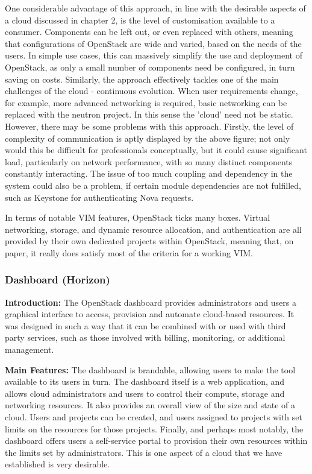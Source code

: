 One considerable advantage of this approach, in line with the desirable aspects of a cloud discussed in chapter 2, is the level of customisation available to a consumer. Components can be left out, or even replaced with others, meaning that configurations of OpenStack are wide and varied, based on the needs of the users. In simple use cases, this can massively simplify the use and deployment of OpenStack, as only a small number of components need be configured, in turn saving on costs. Similarly, the approach effectively tackles one of the main challenges of the cloud - continuous evolution. When user requirements change, for example, more advanced networking is required, basic networking can be replaced with the neutron project. In this sense the 'cloud' need not be static. 
However, there may be some problems with this approach. Firstly, the level of complexity of communication is aptly displayed by the above figure; not only would this be difficult for professionals conceptually, but it could cause significant load, particularly on network performance, with so many distinct components constantly interacting. The issue of too much coupling and dependency in the system could also be a problem, if certain module dependencies are not fulfilled, such as Keystone for authenticating Nova requests. 

In terms of notable VIM features, OpenStack ticks many boxes. Virtual networking, storage, and dynamic resource allocation, and authentication are all provided by their own dedicated projects within OpenStack, meaning that, on paper, it really does satisfy most of the criteria for a working VIM. 

\subsubsection{Dashboard (Horizon)}

\textbf{Introduction:}
The OpenStack dashboard provides administrators and users a graphical interface to access, provision and automate cloud-based resources\cite{openstackdashboard}. It was designed in such a way that it can be combined with or used with third party services, such as those involved with billing, monitoring, or additional management. 

\textbf{Main Features:}
The dashboard is brandable, allowing users to make the tool available to its users in turn. The dashboard itself is a web application, and allows cloud administrators and users to control their compute, storage and networking resources. It also provides an overall view of the size and state of a cloud. Users and projects can be created, and users assigned to projects with set limits on the resources for those projects. Finally, and perhaps most notably, the dashboard offers users a self-service portal to provision their own resources within the limits set by administrators\cite{openstackdashboard}. This is one aspect of a cloud that we have established is very desirable. 

